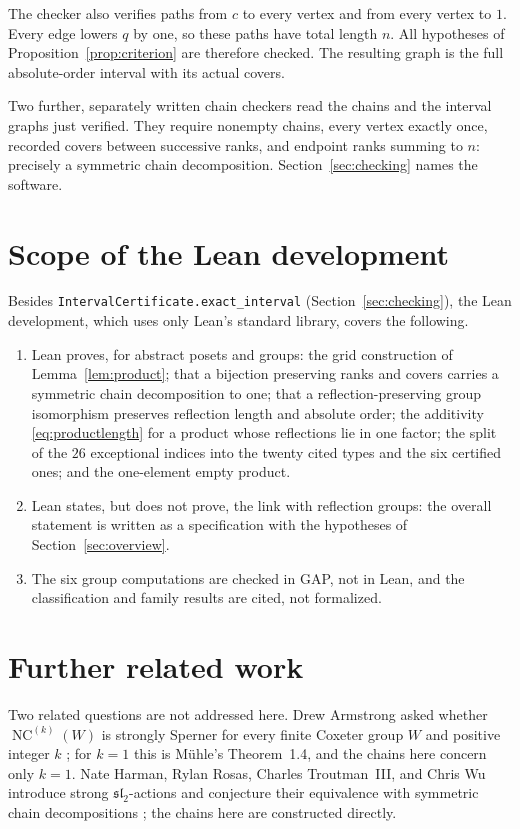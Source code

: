 \documentclass[11pt]{article}
\theoremstyle{definition}
\newcommand{\NC}{\operatorname{NC}}
\begin{document}
\begin{appendices}
The checker also verifies paths from $c$ to every vertex and from every
vertex to $1$. Every edge lowers $q$ by one, so these paths have
total length $n$. All hypotheses of Proposition~\ref{prop:criterion} are
therefore checked. The resulting graph is the full absolute-order
interval with its actual covers.

Two further, separately written chain checkers read the chains and
the interval graphs just verified. They require nonempty chains, every
vertex exactly once, recorded covers between successive ranks, and
endpoint ranks summing to $n$: precisely a symmetric chain
decomposition. Section~\ref{sec:checking} names the software.

\section{Scope of the Lean development}\label{app:lean}
Besides \texttt{IntervalCertificate.exact\_interval}
(Section~\ref{sec:checking}), the Lean development, which uses only
Lean's standard library, covers the following.
\begin{enumerate}
\item Lean proves, for abstract posets and groups: the grid construction
  of Lemma~\ref{lem:product}; that a bijection preserving ranks and
  covers carries a symmetric chain decomposition to one; that a
  reflection-preserving group isomorphism preserves reflection length
  and absolute order; the additivity \eqref{eq:productlength} for a
  product whose reflections lie in one factor; the split of the $26$
  exceptional indices into the twenty cited types and the six certified
  ones; and the one-element empty product.
\item Lean states, but does not prove, the link with reflection groups:
  the overall statement is written as a specification with the
  hypotheses of Section~\ref{sec:overview}.
\item The six group computations are checked in GAP, not in Lean, and
  the classification and family results are cited, not formalized.
\end{enumerate}

\section{Further related work}
Two related questions are not addressed here. Drew Armstrong asked
whether $\NC^{(k)}(W)$ is strongly Sperner for every finite Coxeter
group $W$ and positive integer $k$
\cite[Section~3.5, Open Problem~3.5.12]{Armstrong}; for $k=1$ this is
M\"uhle's Theorem~1.4, and the chains here concern only $k=1$. Nate
Harman, Rylan Rosas, Charles Troutman~III, and Chris Wu introduce
strong $\mathfrak{sl}_2$-actions and conjecture their equivalence with
symmetric chain decompositions
\cite[Definition~1.1 and Conjecture~1.2]{HRTW}; the chains here are
constructed directly.


\end{appendices}
\end{document}
